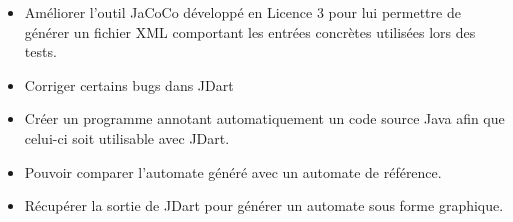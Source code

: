 \begin{itemize}
\item Améliorer l'outil JaCoCo développé en Licence 3 pour lui
  permettre de générer un fichier XML comportant les entrées concrètes
  utilisées lors des tests.
\item Corriger certains bugs dans JDart
\item Créer un programme annotant automatiquement un code source Java
  afin que celui-ci soit utilisable avec JDart.
\item Pouvoir comparer l'automate généré avec un automate de
  référence.
\item Récupérer la sortie de JDart pour générer un automate sous forme
  graphique.
\end{itemize}